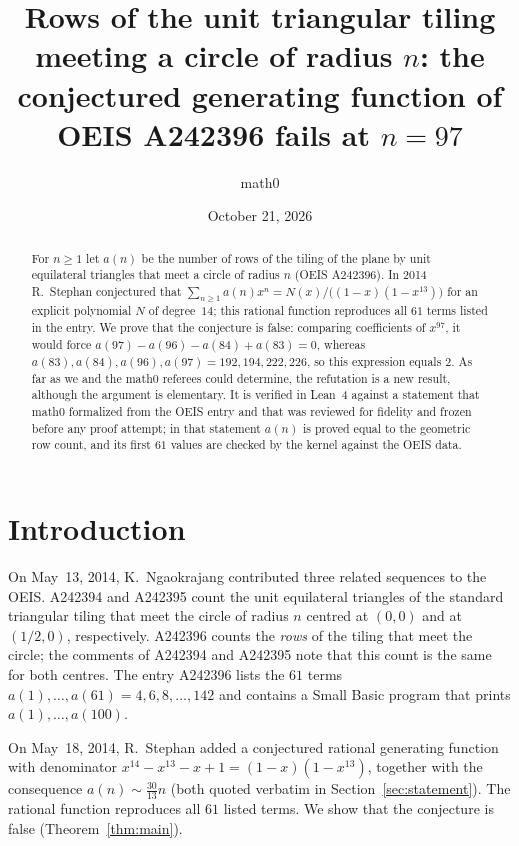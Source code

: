 \documentclass[11pt]{amsart}
\title[The conjectured generating function of OEIS A242396 is false]{Rows of the unit triangular tiling meeting a circle of radius $n$: the conjectured generating function of OEIS A242396 fails at $n=97$}
\author{math0}
\date{October 21, 2026}
\theoremstyle{plain}
\theoremstyle{definition}
\begin{document}
\begin{abstract}
For $n\ge1$ let $a(n)$ be the number of rows of the tiling of the plane by unit equilateral triangles that meet a circle of radius $n$ (OEIS A242396). In 2014 R.~Stephan conjectured that $\sum_{n\ge1}a(n)x^n=N(x)/\bigl((1-x)(1-x^{13})\bigr)$ for an explicit polynomial $N$ of degree~$14$; this rational function reproduces all $61$ terms listed in the entry.
We prove that the conjecture is false: comparing coefficients of $x^{97}$, it would force $a(97)-a(96)-a(84)+a(83)=0$, whereas $a(83),a(84),a(96),a(97)=192,194,222,226$, so this expression equals $2$. As far as we and the math0 referees could determine, the refutation is a new result, although the argument is elementary.
It is verified in Lean~4 against a statement that math0 formalized from the OEIS entry and that was reviewed for fidelity and frozen before any proof attempt; in that statement $a(n)$ is proved equal to the geometric row count, and its first $61$ values are checked by the kernel against the OEIS data.
\end{abstract}
\maketitle

\section{Introduction}

On May~13, 2014, K.~Ngaokrajang contributed three related sequences to the OEIS. A242394 \cite{A242394} and A242395 \cite{A242395} count the unit equilateral triangles of the standard triangular tiling that meet the circle of radius $n$ centred at $(0,0)$ and at $(1/2,0)$, respectively. A242396 \cite{A242396} counts the \emph{rows} of the tiling that meet the circle; the comments of A242394 and A242395 note that this count is the same for both centres. The entry A242396 lists the $61$ terms $a(1),\dots,a(61)=4,6,8,\dots,142$ and contains a Small Basic program that prints $a(1),\dots,a(100)$.

On May~18, 2014, R.~Stephan added a conjectured rational generating function with denominator $x^{14}-x^{13}-x+1=(1-x)(1-x^{13})$, together with the consequence $a(n)\sim\frac{30}{13}n$ (both quoted verbatim in Section~\ref{sec:statement}). The rational function reproduces all $61$ listed terms. We show that the conjecture is false (Theorem~\ref{thm:main}).
\end{document}
